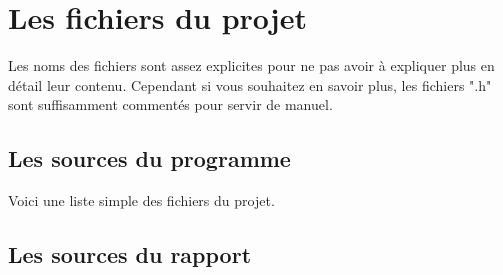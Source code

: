 \chapter{Les fichiers du projet}

Les noms des fichiers sont assez explicites pour ne pas avoir à expliquer plus en détail leur contenu. 
Cependant si vous souhaitez en savoir plus, les fichiers ".h" sont suffisamment commentés pour servir de manuel.

\section{Les sources du programme}

Voici une liste simple des fichiers du projet.


\section{Les sources du rapport}



\clearpage
